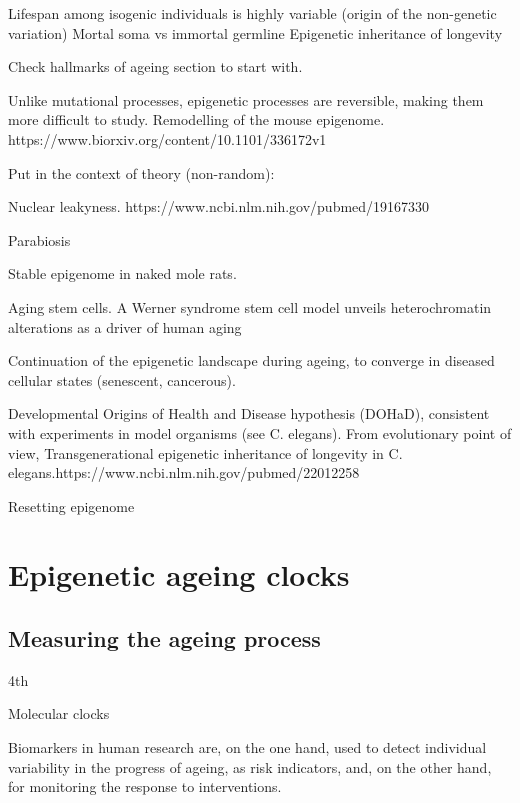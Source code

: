 \bigskip

Lifespan among isogenic individuals is highly variable (origin of the non-genetic variation)
Mortal soma vs immortal germline
Epigenetic inheritance of longevity


Check hallmarks of ageing section to start with.

Unlike mutational processes, epigenetic processes are reversible, making them more difficult to study.
Remodelling of the mouse epigenome. 
https://www.biorxiv.org/content/10.1101/336172v1



Put in the context of theory (non-random): %



Nuclear leakyness. 
https://www.ncbi.nlm.nih.gov/pubmed/19167330

Parabiosis

Stable epigenome in naked mole rats.



Aging stem cells. A Werner syndrome stem cell model unveils heterochromatin alterations as a driver of human aging

Continuation of the epigenetic landscape during ageing, to converge in diseased cellular states (senescent, cancerous).

Developmental Origins of Health and Disease hypothesis (DOHaD), consistent with experiments in model organisms (see C. elegans). From evolutionary point of view, Transgenerational epigenetic inheritance of longevity in C. elegans.https://www.ncbi.nlm.nih.gov/pubmed/22012258

Resetting epigenome





\section{Epigenetic ageing clocks}

\subsection{Measuring the ageing process}

4th

Molecular clocks

Biomarkers in human research are, on the one hand, used to detect individual variability in the progress of ageing, as risk indicators, and, on the other hand, for monitoring the response to interventions. 

